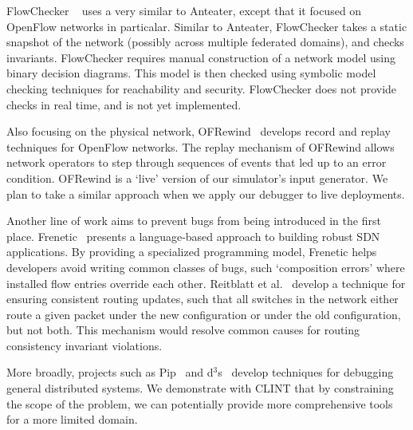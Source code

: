 FlowChecker ~\cite{flowchecker} uses a very similar to Anteater, except that
it focused on OpenFlow networks in particalar.  Similar to Anteater, FlowChecker
takes a static snapshot of the network (possibly across multiple federated
domains), and checks invariants. FlowChecker requires manual construction of a
network model using binary decision diagrams. This model is then checked using symbolic model checking
techniques for reachability and security. FlowChecker does not provide checks in real
time, and is not yet implemented.

Also focusing on the physical network, OFRewind~\cite{ofrewind} develops record and replay techniques
for OpenFlow networks. The replay
mechanism of OFRewind allows network operators to step through sequences of
events that led up to an error condition. OFRewind is a `live' version of our
simulator's input generator. We plan to take a similar approach when we apply
our debugger to live deployments. 

Another line of work aims to prevent bugs from being introduced in the first
place. Frenetic~\cite{frenetic} presents a language-based approach to building
robust SDN applications. By providing a specialized programming model, Frenetic helps developers avoid writing common classes of
bugs, such `composition errors' where installed flow entries override each other.
Reitblatt et al.~\cite{consistentupdates} develop a technique for ensuring
consistent routing updates, such that all switches in the network either route
a given packet under the new configuration or under the old configuration,
but not both. This mechanism would resolve common causes for routing consistency 
invariant violations.


More broadly, projects such as Pip~\cite{pip} and d$^3$s~\cite{d3s} develop
techniques for debugging general distributed systems. 
We demonstrate with CLINT that by constraining the scope of the problem,
we can potentially provide more comprehensive tools for a more limited domain.






